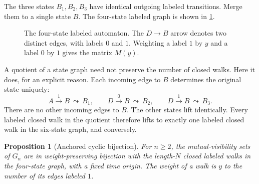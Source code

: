 \documentclass[11pt,a4paper]{article}
\newtheorem{proposition}[theorem]{Proposition}
\theoremstyle{definition}
\begin{document}
The three states $B_1,B_2,B_3$ have identical outgoing labeled transitions.
Merge them to a single state $B$. The four-state labeled graph is shown in
\cref{fig:automaton}.

\begin{figure}[htbp]
\centering
{}
\caption{The four-state labeled automaton. The $D\to B$ arrow denotes two
 distinct edges, with labels $0$ and $1$. Weighting a label $1$ by $y$ and a
 label $0$ by $1$ gives the matrix $M(y)$.}
\label{fig:automaton}
\end{figure}

A quotient of a state graph need not preserve the number of closed walks.
Here it does, for an explicit reason. Each incoming edge to $B$ determines
the original state uniquely:
\begin{equation}
 A\xrightarrow{1}B\ \leadsto\ B_1,\qquad
 D\xrightarrow{0}B\ \leadsto\ B_2,\qquad
 D\xrightarrow{1}B\ \leadsto\ B_3.
 \label{eq:lift}
\end{equation}
There are no other incoming edges to $B$. The other states lift identically.
Every labeled closed walk in the quotient therefore lifts to exactly one
labeled closed walk in the six-state graph, and conversely.

\begin{proposition}[Anchored cyclic bijection]
\label{prop:bijection}
For $n\ge2$, the mutual-visibility sets of $G_n$ are in weight-preserving
bijection with the length-$N$ closed labeled walks in the four-state graph,
with a fixed time origin. The weight of a walk is $y$ to the number of its
edges labeled $1$.
\end{proposition}
\end{document}
